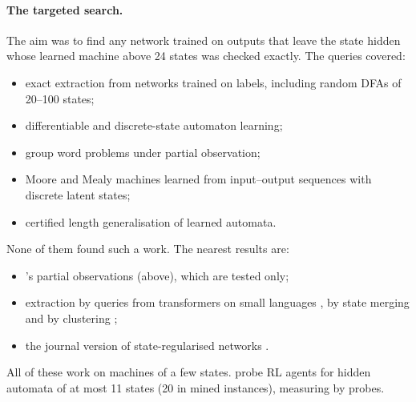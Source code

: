 \documentclass[11pt]{article}
\begin{document}
\paragraph{The targeted search.} The aim was to find any network trained on outputs that leave the
state hidden whose learned machine above 24 states was checked exactly. The queries covered:
\begin{itemize}
\item exact extraction from networks trained on labels, including random DFAs of 20--100 states;
\item differentiable and discrete-state automaton learning;
\item group word problems under partial observation;
\item Moore and Mealy machines learned from input--output sequences with discrete latent states;
\item certified length generalisation of learned automata.
\end{itemize}
None of them found such a work. The nearest results are:
\begin{itemize}
\item \citet{liu-2022-transformers-shortcuts-automata}'s partial observations (above), which are
  tested only;
\item extraction by queries from transformers on small languages
  \citep{adriaensen-2024-extracting-moore-machines-transformers}, by state merging
  \citep{merrill-2022-extracting-automata-state-merging} and by clustering
  \citep{muskardin-2023-rnn-hidden-states-semantic-ground-truth};
\item the journal version of state-regularised networks
  \citep{wang-2022-state-regularized-rnns-extract-automata}.
\end{itemize}
All of these work on machines of a few states. \citet{allchin-2026-reward-teach-state-hidden-automaton}
probe RL agents for hidden automata of at most 11 states (20 in mined instances), measuring by probes.
\end{document}
